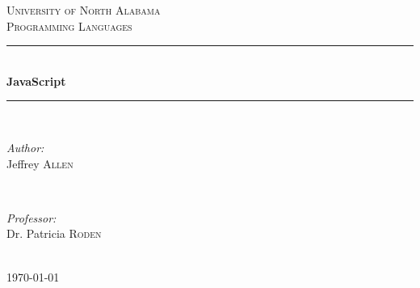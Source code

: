 \documentclass[12pt]{scrreprt}
\begin{document}
 

\begin{titlepage}

\newcommand{\HRule}{\rule{\linewidth}{0.5mm}} %

\center %


\textsc{\LARGE University of North Alabama}\\[1.5cm] %
\textsc{\Large Programming Languages}\\[0.5cm] %


\HRule \\[0.4cm]
{ \huge \bfseries JavaScript}\\[0.4cm] %
\HRule \\[1.5cm]
 

\begin{minipage}{0.4\textwidth}
\begin{flushleft} \large
\emph{Author:}\\
Jeffrey \textsc{Allen}
\end{flushleft}
\end{minipage}
~
\begin{minipage}{0.4\textwidth}
\begin{flushright} \large
\emph{Professor:} \\
Dr. Patricia \textsc{Roden}
\end{flushright}
\end{minipage}\\[4cm]

{\large \today}\\[3cm] %

\vfill %

\end{titlepage}
\end{document}

